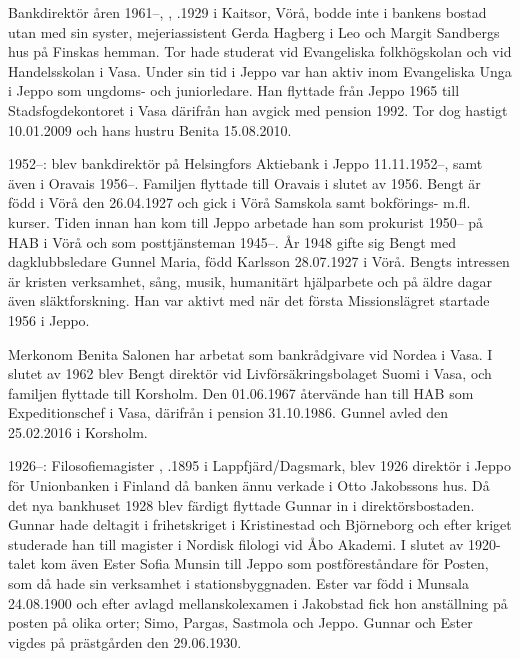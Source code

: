 Bankdirektör åren 1961--, , .1929 i Kaitsor, Vörå, bodde inte i bankens bostad utan med sin syster, mejeriassistent Gerda Hagberg i Leo och Margit Sandbergs hus på Finskas hemman. Tor hade studerat vid Evangeliska folkhögskolan och vid Handelsskolan i Vasa. Under sin tid i Jeppo var han aktiv inom Evangeliska Unga i	Jeppo som ungdoms- och juniorledare. Han flyttade från Jeppo 1965 till Stadsfogdekontoret i Vasa därifrån han avgick med pension 1992. Tor dog hastigt 10.01.2009 och hans hustru Benita 15.08.2010.


1952--:
 blev bankdirektör på Helsingfors Aktiebank i Jeppo 11.11.1952--, samt även i Oravais 1956--. Familjen flyttade till Oravais i slutet av 1956. Bengt är född i Vörå den 26.04.1927 och gick i Vörå Samskola samt bokförings- m.fl. kurser. Tiden innan han kom till Jeppo arbetade han som prokurist 1950-- på HAB i Vörå och som posttjänsteman 1945--. År 1948 gifte sig Bengt med dagklubbsledare Gunnel Maria, född Karlsson 28.07.1927 i Vörå. Bengts intressen är kristen verksamhet, sång, musik, humanitärt hjälparbete och på äldre dagar även släktforskning. Han var aktivt med när det första Missionslägret startade 1956 i Jeppo.
\begin{jhchildren}
  \item {}
  \item {}
  \item {}
\end{jhchildren}
Merkonom Benita Salonen har arbetat som bankrådgivare vid Nordea i Vasa. I slutet av 1962 blev Bengt direktör vid Livförsäkringsbolaget Suomi i Vasa, och familjen flyttade till Korsholm. Den 01.06.1967 återvände han till HAB som Expeditionschef i Vasa, därifrån i pension  31.10.1986. Gunnel avled den 25.02.2016 i Korsholm.


1926--:
Filosofiemagister , .1895 i Lappfjärd/Dagsmark, blev 1926 direktör i Jeppo för 	Unionbanken i Finland då banken ännu verkade i Otto Jakobssons hus. Då det nya bankhuset 1928 blev färdigt flyttade Gunnar in i direktörsbostaden. Gunnar hade deltagit i frihetskriget i Kristinestad och Björneborg och efter kriget studerade han till magister i Nordisk filologi vid Åbo Akademi. I slutet av 1920-talet kom även Ester Sofia Munsin till Jeppo som postföreståndare för Posten, som då hade sin verksamhet i stationsbyggnaden. Ester var född i Munsala 24.08.1900 och efter avlagd mellanskolexamen i Jakobstad fick hon anställning på posten på olika orter; Simo, Pargas, Sastmola och Jeppo. Gunnar och Ester vigdes på prästgården den 29.06.1930.

